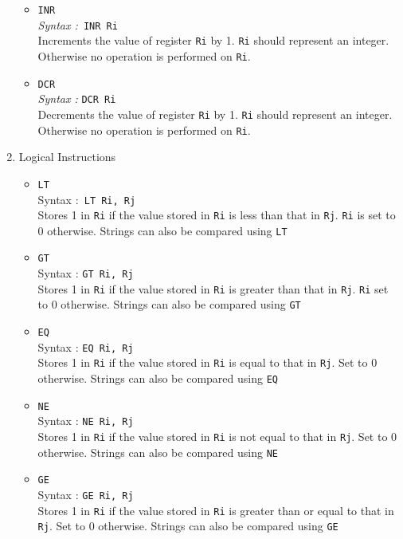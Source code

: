 \documentclass[11pt]{article}
\begin{document}
\begin{enumerate}
\begin{itemize}
\item \texttt{INR\\}
\textit{Syntax :}\texttt{ INR Ri}\\
Increments the value of register \texttt{Ri} by 1.  \texttt{Ri} should represent an integer. Otherwise no operation is performed on \texttt{Ri}.

\item  \texttt{DCR}\\
\textit{Syntax :} \texttt{DCR Ri}\\
Decrements the value of register \texttt{Ri} by 1. \texttt{Ri} should represent an integer. Otherwise no operation is performed on \texttt{Ri}.

\end{itemize}


\item Logical Instructions
\begin{itemize}
\item \texttt{LT}\\
Syntax :\texttt{ LT Ri, Rj}\\
Stores 1 in \texttt{Ri} if the value stored in \texttt{Ri} is less than that in \texttt{Rj}. \texttt{Ri} is set to 0 otherwise. Strings can also be compared using \texttt{LT}

\item \texttt{GT}\\
Syntax : \texttt{GT Ri, Rj}\\
Stores 1 in \texttt{Ri} if the value stored in \texttt{Ri} is greater than that in \texttt{Rj}. \texttt{Ri} set to 0 otherwise. Strings can also be compared using \texttt{GT}

\item \texttt{EQ}\\
Syntax : \texttt{EQ Ri, Rj}\\
Stores 1 in \texttt{Ri} if the value stored in \texttt{Ri} is equal to that in \texttt{Rj}. Set to 0 otherwise. Strings can also be compared using \texttt{EQ}

\item \texttt{NE}\\
Syntax : \texttt{NE Ri, Rj}\\
Stores 1 in \texttt{Ri} if the value stored in \texttt{Ri} is not equal to that in \texttt{Rj}. Set to 0 otherwise. Strings can also be compared using \texttt{NE}

\item \texttt{GE} \\
Syntax : \texttt{GE Ri, Rj} \\
Stores 1 in \texttt{Ri} if the value stored in \texttt{Ri} is greater than or equal to that in \texttt{Rj}. Set to 0 otherwise. Strings can also be compared using \texttt{GE}


\end{itemize}
\end{enumerate}
\end{document}
